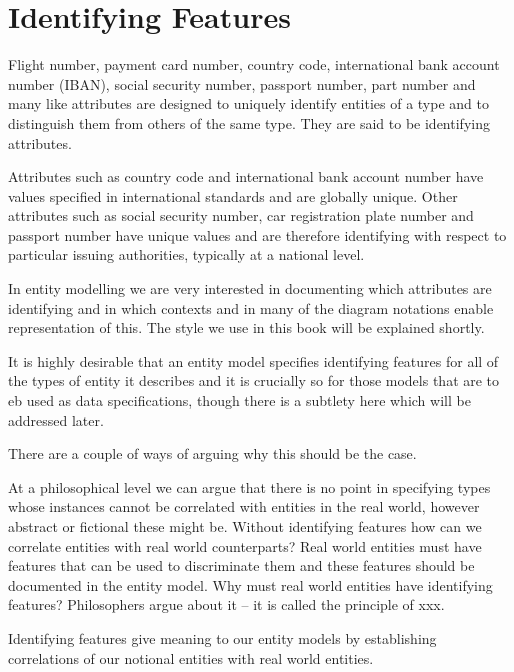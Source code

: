 \section{Identifying Features}
\label{IdentifyingFeatures}
\mynote
Flight number, payment card number, country code, international bank account number (IBAN), social security number, passport number, part number and many like attributes are designed to uniquely identify entities of a type and to distinguish them from others of the same type. They are said to be identifying attributes.

\mynote 
Attributes such as country code and international bank account number 
have values  specified in international standards and are globally unique. 
Other attributes such as 
social security number, car registration plate number and passport number have unique values and are therefore identifying with respect to particular issuing authorities, typically at a national level.

\mynote
In entity modelling we are very interested in documenting which attributes are identifying and in which contexts and in many of the diagram notations enable representation of this. The style we use in this book will be explained shortly.

\mynote It is highly desirable that an entity model specifies identifying features for all of the types of entity it describes and it is crucially so  for those models that are to eb used as data specifications, though there is a subtlety here which will be addressed later.  

\mynote
There are a couple of ways of arguing why this should be the case. 

\mynote At a philosophical level we can argue that there is no point in specifying types whose instances cannot be correlated with entities in the real world, however abstract or fictional these might be. Without identifying features how can we correlate entities with real world counterparts?
Real world entities must have features that can be used to discriminate them and these features should be documented in the entity model. Why must real world entities have identifying features? 
Philosophers argue about it -- it is called the principle of xxx.

\mynote Identifying features give meaning to our entity models by establishing correlations of our notional entities with real world entities.

